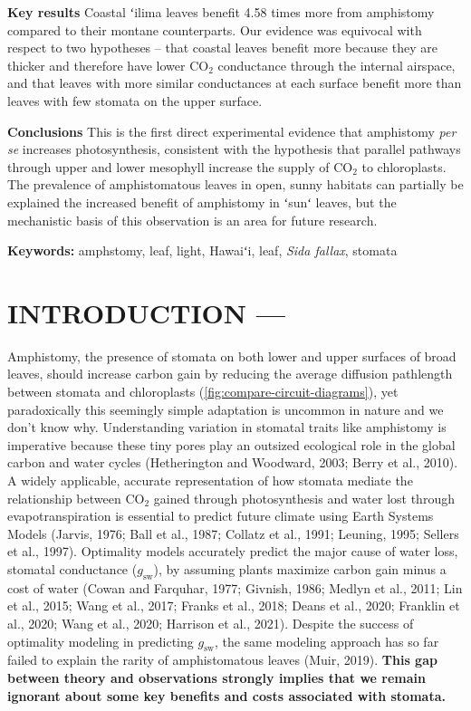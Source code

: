 \documentclass[
  letterpaper,
  DIV=11,
  numbers=noendperiod]{scrartcl}
\begin{document}
\textbf{Key results} Coastal ʻilima leaves benefit 4.58 times more from
amphistomy compared to their montane counterparts. Our evidence was
equivocal with respect to two hypotheses -- that coastal leaves benefit
more because they are thicker and therefore have lower CO\(_2\)
conductance through the internal airspace, and that leaves with more
similar conductances at each surface benefit more than leaves with few
stomata on the upper surface.

\textbf{Conclusions} This is the first direct experimental evidence that
amphistomy \emph{per se} increases photosynthesis, consistent with the
hypothesis that parallel pathways through upper and lower mesophyll
increase the supply of CO\(_2\) to chloroplasts. The prevalence of
amphistomatous leaves in open, sunny habitats can partially be explained
the increased benefit of amphistomy in ʻsunʻ leaves, but the mechanistic
basis of this observation is an area for future research.

\textbf{Keywords:} amphstomy, leaf, light, Hawaiʻi, leaf, \emph{Sida
fallax}, stomata

\hypertarget{introduction}{%
\section{INTRODUCTION ---}\label{introduction}}

Amphistomy, the presence of stomata on both lower and upper surfaces of
broad leaves, should increase carbon gain by reducing the average
diffusion pathlength between stomata and chloroplasts
(\autoref{fig:compare-circuit-diagrams}), yet paradoxically this
seemingly simple adaptation is uncommon in nature and we don't know why.
Understanding variation in stomatal traits like amphistomy is imperative
because these tiny pores play an outsized ecological role in the global
carbon and water cycles (Hetherington and Woodward, 2003; Berry et al.,
2010). A widely applicable, accurate representation of how stomata
mediate the relationship between CO\(_2\) gained through photosynthesis
and water lost through evapotranspiration is essential to predict future
climate using Earth Systems Models (Jarvis, 1976; Ball et al., 1987;
Collatz et al., 1991; Leuning, 1995; Sellers et al., 1997). Optimality
models accurately predict the major cause of water loss, stomatal
conductance (\(g_\mathrm{sw}\)), by assuming plants maximize carbon gain
minus a cost of water (Cowan and Farquhar, 1977; Givnish, 1986; Medlyn
et al., 2011; Lin et al., 2015; Wang et al., 2017; Franks et al., 2018;
Deans et al., 2020; Franklin et al., 2020; Wang et al., 2020; Harrison
et al., 2021). Despite the success of optimality modeling in predicting
\(g_\mathrm{sw}\), the same modeling approach has so far failed to
explain the rarity of amphistomatous leaves (Muir, 2019). \textbf{This
gap between theory and observations strongly implies that we remain
ignorant about some key benefits and costs associated with stomata.}
\end{document}
